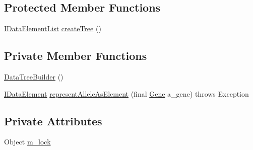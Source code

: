 \subsection*{Protected Member Functions}
\begin{DoxyCompactItemize}
\item 
\hyperlink{interfaceorg_1_1jgap_1_1data_1_1_i_data_element_list}{I\-Data\-Element\-List} \hyperlink{classorg_1_1jgap_1_1data_1_1_data_tree_builder_ad394bf65e084c7bbd85f3b2ec98c79cc}{create\-Tree} ()
\end{DoxyCompactItemize}
\subsection*{Private Member Functions}
\begin{DoxyCompactItemize}
\item 
\hyperlink{classorg_1_1jgap_1_1data_1_1_data_tree_builder_af6a002e901118676ffddf465e2458e5a}{Data\-Tree\-Builder} ()
\item 
\hyperlink{interfaceorg_1_1jgap_1_1data_1_1_i_data_element}{I\-Data\-Element} \hyperlink{classorg_1_1jgap_1_1data_1_1_data_tree_builder_af8fb5596711aa6986b9616641ae5433d}{represent\-Allele\-As\-Element} (final \hyperlink{interfaceorg_1_1jgap_1_1_gene}{Gene} a\-\_\-gene)  throws Exception 
\end{DoxyCompactItemize}
\subsection*{Private Attributes}
\begin{DoxyCompactItemize}
\item 
Object \hyperlink{classorg_1_1jgap_1_1data_1_1_data_tree_builder_a219127f0652185c804595fe5231565d4}{m\-\_\-lock}
\end{DoxyCompactItemize}
